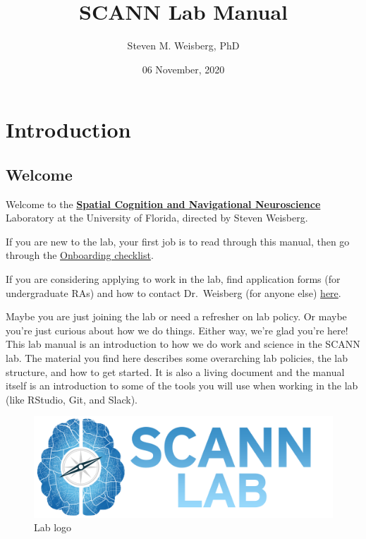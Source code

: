 \documentclass[
  12pt,
]{book}
\title{SCANN Lab Manual}
\author{Steven M. Weisberg, PhD}
\date{06 November, 2020}
\begin{document}
\maketitle

{
\hypersetup{linkcolor=}
\setcounter{tocdepth}{1}
\tableofcontents
}
\hypertarget{part-introduction}{%
\part*{Introduction}\label{part-introduction}}

\hypertarget{welcome}{%
\chapter{Welcome}\label{welcome}}

Welcome to the \href{https://scannlab.psych.ufl.edu}{\textbf{Spatial Cognition and Navigational Neuroscience}} Laboratory at the University of Florida, directed by Steven Weisberg.

If you are new to the lab, your first job is to read through this manual, then go through the \href{onboarding}{Onboarding checklist}.

If you are considering applying to work in the lab, find application forms (for undergraduate RAs) and how to contact Dr.~Weisberg (for anyone else) \href{https://scannlab.psych.ufl.edu/join-us}{here}.

Maybe you are just joining the lab or need a refresher on lab policy. Or maybe you're just curious about how we do things. Either way, we're glad you're here! This lab manual is an introduction to how we do work and science in the SCANN lab. The material you find here describes some overarching lab policies, the lab structure, and how to get started. It is also a living document and the manual itself is an introduction to some of the tools you will use when working in the lab (like RStudio, Git, and Slack).

\begin{figure}
\centering
\includegraphics{figs/SCANN_Lab_Logo_NoOutline_With_Text.png}
\caption{Lab logo}
\end{figure}
\end{document}
